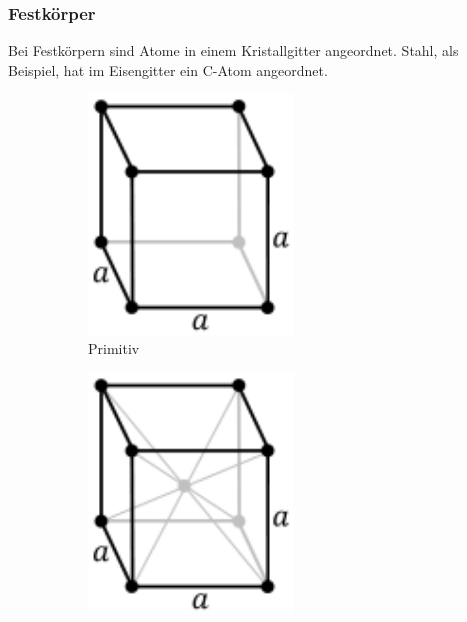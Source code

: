 \documentclass[a4paper,11pt]{article}
\begin{document}
\subsubsection{Festkörper}
Bei Festkörpern sind Atome in einem Kristallgitter angeordnet.
Stahl, als Beispiel, hat im Eisengitter ein C-Atom angeordnet.

\begin{figure}[!ht]
    \centering
    \begin{subfigure}[!ht]{0.2\textwidth}
        \centering
        \includegraphics[width=0.6\textwidth]{cubic.png}
        \caption[https://de.wikipedia.org/wiki/Bravais-Gitter]{Primitiv}
    \end{subfigure}
    \begin{subfigure}[!ht]{0.2\textwidth}
        \centering
        \includegraphics[width=0.6\textwidth]{cubic-centered.png}

\end{subfigure}
\end{figure}
\end{document}
